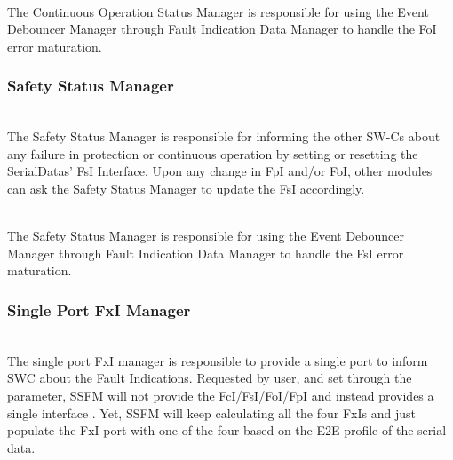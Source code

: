 \\
The Continuous Operation Status Manager is responsible for using the Event Debouncer Manager through Fault Indication Data Manager
to handle the FoI error maturation.
\\
{    }



\subsubsection{Safety Status Manager}
\\
The Safety Status Manager is responsible for informing the other SW-Cs about any failure in protection or continuous operation by setting or resetting the SerialDatas' FsI Interface. Upon any change in FpI and/or FoI, other modules can ask the Safety Status Manager to update the FsI accordingly.

{ }

\\
The Safety Status Manager is responsible for using the Event Debouncer Manager through Fault Indication Data Manager 
to handle the FsI error maturation.
\\
{    }



\subsubsection{Single Port FxI Manager}
\\
The single port FxI manager is responsible to provide a single port to inform SWC about the Fault Indications. Requested by user,
 and set through the  parameter, SSFM will not provide the FcI/FsI/FoI/FpI and instead provides 
 a single interface . Yet, SSFM will keep calculating all the four FxIs and just populate the FxI port with one of the four
 based on the E2E profile of the serial data.
 

